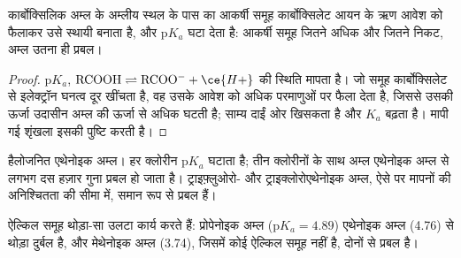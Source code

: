 \begin{proposition}[प्रेरणिक प्रभाव और अम्लता]\label{prop:b1:electronic-effects:inductive-pka}
कार्बोक्सिलिक अम्ल के अम्लीय स्थल के पास का आकर्षी समूह
कार्बोक्सिलेट आयन के ऋण आवेश को फैलाकर उसे स्थायी बनाता है, और
$\mathrm{p}K_a$ घटा देता है: आकर्षी समूह जितने अधिक और जितने निकट, अम्ल
उतना ही प्रबल।
\end{proposition}

\begin{proof}
$\mathrm{p}K_a$, $\mathrm{RCOOH} \rightleftharpoons
\mathrm{RCOO^-} + \ce{H+}$ की स्थिति मापता है। जो समूह कार्बोक्सिलेट से
इलेक्ट्रॉन घनत्व दूर खींचता है, वह उसके आवेश को अधिक परमाणुओं पर फैला देता है, जिससे
उसकी ऊर्जा उदासीन अम्ल की ऊर्जा से अधिक घटती है; साम्य दाईं ओर
खिसकता है और $K_a$ बढ़ता है। मापी गई शृंखला इसकी पुष्टि करती है।
\end{proof}

\begin{omfigure}

{\small हैलोजनित एथेनोइक अम्ल। हर क्लोरीन
$\mathrm{p}K_a$ घटाता है; तीन क्लोरीनों के साथ अम्ल एथेनोइक अम्ल से लगभग दस हज़ार गुना
प्रबल हो जाता है। ट्राइफ़्लुओरो- और ट्राइक्लोरोएथेनोइक अम्ल,
ऐसे  पर मापनों की अनिश्चितता की सीमा में, समान रूप से
प्रबल हैं।}
\end{omfigure}

ऐल्किल समूह थोड़ा-सा उलटा कार्य करते हैं: प्रोपेनोइक अम्ल ($\mathrm{p}K_a
= 4.89$) एथेनोइक अम्ल (4.76) से थोड़ा दुर्बल है, और मेथेनोइक अम्ल
(3.74), जिसमें कोई ऐल्किल समूह नहीं है, दोनों से प्रबल है।

